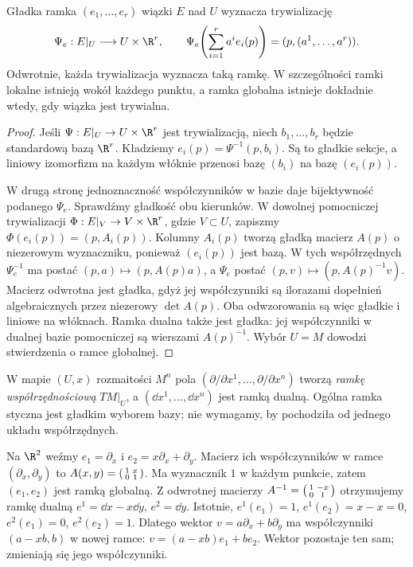 \begin{stwierdzenie}
\label{prop:ramka-trywializacja}
Gładka ramka $(e_1,\ldots,e_r)$ wiązki $E$ nad $U$
wyznacza trywializację
\[
 \Psi_e:E|_U\longrightarrow U\times\R^r,\qquad
 \Psi_e\!\left(\sum_{i=1}^r a^i e_i(p)\right)
       =(p,(a^1,\ldots,a^r)).
\]
Odwrotnie, każda trywializacja wyznacza taką ramkę.
W szczególności ramki lokalne istnieją wokół każdego punktu,
a ramka globalna istnieje dokładnie wtedy, gdy wiązka jest trywialna.
\end{stwierdzenie}
\begin{proof}
Jeśli $\Psi:E|_U\to U\times\R^r$ jest trywializacją,
niech $b_1,\ldots,b_r$ będzie standardową bazą $\R^r$.
Kładziemy $e_i(p)=\Psi^{-1}(p,b_i)$.
Są to gładkie sekcje, a liniowy izomorfizm na każdym
włóknie przenosi bazę $(b_i)$ na bazę $(e_i(p))$.

W drugą stronę jednoznaczność współczynników w bazie
daje bijektywność podanego $\Psi_e$.
Sprawdźmy gładkość obu kierunków.
W dowolnej pomocniczej trywializacji
$\Phi:E|_V\to V\times\R^r$, gdzie $V\subset U$,
zapiszmy $\Phi(e_i(p))=(p,A_i(p))$.
Kolumny $A_i(p)$ tworzą gładką macierz $A(p)$
o niezerowym wyznaczniku, ponieważ $(e_i(p))$ jest bazą.
W tych współrzędnych $\Psi_e^{-1}$ ma postać
$(p,a)\mapsto(p,A(p)a)$, a $\Psi_e$ postać
$(p,v)\mapsto(p,A(p)^{-1}v)$.
Macierz odwrotna jest gładka, gdyż jej współczynniki
są ilorazami dopełnień algebraicznych przez niezerowy $\det A(p)$.
Oba odwzorowania są więc gładkie i liniowe na włóknach.
Ramka dualna także jest gładka: jej współczynniki
w dualnej bazie pomocniczej są wierszami $A(p)^{-1}$.
Wybór $U=M$ dowodzi stwierdzenia o ramce globalnej.
\end{proof}

W mapie $(U,x)$ rozmaitości $M^n$ pola
$(\partial/\partial x^1,\ldots,\partial/\partial x^n)$
tworzą \emph{ramkę współrzędnościową} $TM|_U$,
a $(\dd x^1,\ldots,\dd x^n)$ jest ramką dualną.
Ogólna ramka styczna jest gładkim wyborem bazy;
nie wymagamy, by pochodziła od jednego układu współrzędnych.

\begin{przyklad}
\label{prz:ramka-plaszczyzna}
Na $\R^2$ weźmy $e_1=\partial_x$ i
$e_2=x\partial_x+\partial_y$.
Macierz ich współczynników w ramce
$(\partial_x,\partial_y)$ to
$A(x,y)=\begin{psmallmatrix}1&x\\0&1\end{psmallmatrix}$.
Ma wyznacznik $1$ w każdym punkcie, zatem $(e_1,e_2)$
jest ramką globalną.
Z odwrotnej macierzy
$A^{-1}=\begin{psmallmatrix}1&-x\\0&1\end{psmallmatrix}$
otrzymujemy ramkę dualną
$e^1=\dd x-x\dd y$, $e^2=\dd y$.
Istotnie, $e^1(e_1)=1$, $e^1(e_2)=x-x=0$,
$e^2(e_1)=0$, $e^2(e_2)=1$.
Dlatego wektor $v=a\partial_x+b\partial_y$
ma współczynniki $(a-xb,b)$ w nowej ramce:
$v=(a-xb)e_1+be_2$.
Wektor pozostaje ten sam; zmieniają się jego współczynniki.
\end{przyklad}

